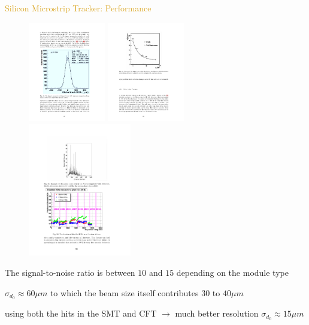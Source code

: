 \begin{frame}{\textcolor{Goldenrod}{Silicon Microstrip Tracker: Performance }}
  \begin{overlayarea}{\textwidth}{\textheight}
    \begin{figure}[h]
      \centering
      \includegraphics[height=0.35\textheight,width=0.3\textwidth]{./Images/11_SMT_01}
      \includegraphics[height=0.35\textheight,width=0.3\textwidth]{./Images/12_SMT_01}
      \includegraphics[height=0.35\textheight,width=0.4\textwidth]{./Images/12_SMT_02}
      
    \end{figure}
    \itt[<+->]  
  \item The signal-to-noise ratio is between $10$ and $15$
    depending on the module type
  \item $\sigma_{d_0} \approx 60 \mu m$ to which the beam size itself
    contributes $30$ to $40 \mu m$
  \item \alert{using both the hits in the SMT and CFT $\to$ much better
      resolution $\sigma_{d_0} \approx 15 \mu m$}
    \tti
    

\end{overlayarea}
\end{frame}
